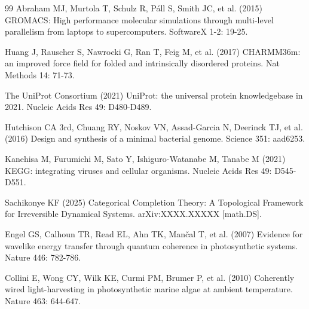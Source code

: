\documentclass[11pt]{article}
\begin{document}
\begin{thebibliography}{99}
Abraham MJ, Murtola T, Schulz R, Páll S, Smith JC, et al. (2015) GROMACS: High performance molecular simulations through multi-level parallelism from laptops to supercomputers. SoftwareX 1-2: 19-25.

Huang J, Rauscher S, Nawrocki G, Ran T, Feig M, et al. (2017) CHARMM36m: an improved force field for folded and intrinsically disordered proteins. Nat Methods 14: 71-73.

The UniProt Consortium (2021) UniProt: the universal protein knowledgebase in 2021. Nucleic Acids Res 49: D480-D489.

Hutchison CA 3rd, Chuang RY, Noskov VN, Assad-Garcia N, Deerinck TJ, et al. (2016) Design and synthesis of a minimal bacterial genome. Science 351: aad6253.

Kanehisa M, Furumichi M, Sato Y, Ishiguro-Watanabe M, Tanabe M (2021) KEGG: integrating viruses and cellular organisms. Nucleic Acids Res 49: D545-D551.

Sachikonye KF (2025) Categorical Completion Theory: A Topological Framework for Irreversible Dynamical Systems. arXiv:XXXX.XXXXX [math.DS].

Engel GS, Calhoun TR, Read EL, Ahn TK, Mančal T, et al. (2007) Evidence for wavelike energy transfer through quantum coherence in photosynthetic systems. Nature 446: 782-786.

Collini E, Wong CY, Wilk KE, Curmi PM, Brumer P, et al. (2010) Coherently wired light-harvesting in photosynthetic marine algae at ambient temperature. Nature 463: 644-647.

\end{thebibliography}
\end{document}
